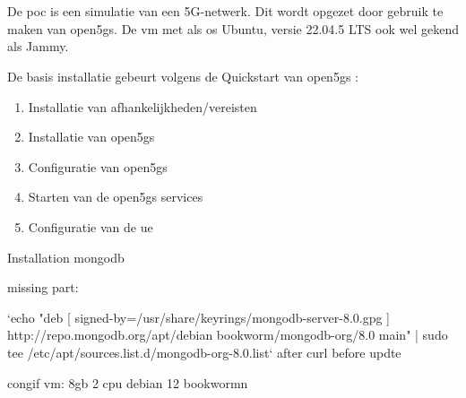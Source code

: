 \chapter{}%
\label{ch:poc1}

De \gls{poc} is een simulatie van een 5G-netwerk. Dit wordt opgezet door gebruik te maken van \gls{open5gs}. De \gls{vm} met als \gls{os} Ubuntu, versie 22.04.5 LTS ook wel gekend als Jammy.

De basis installatie gebeurt volgens de Quickstart van \gls{open5gs} \textcite{Lee2025a}:

\begin{enumerate}
    \item Installatie van afhankelijkheden/vereisten
    \item Installatie van \gls{open5gs}
    \item Configuratie van \gls{open5gs}
    \item Starten van de \gls{open5gs} services
    \item Configuratie van de \gls{ue}
\end{enumerate}


Installation mongodb

missing part: 

`echo "deb [ signed-by=/usr/share/keyrings/mongodb-server-8.0.gpg ] http://repo.mongodb.org/apt/debian bookworm/mongodb-org/8.0 main" | sudo tee /etc/apt/sources.list.d/mongodb-org-8.0.list`
after curl before updte

congif vm: 8gb 2 cpu debian 12 bookwormn